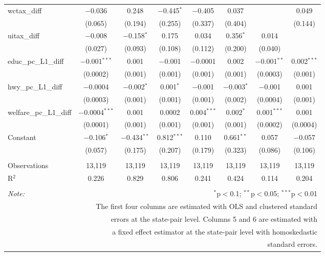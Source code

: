 \begin{table}[!htbp]
\begin{tabular}{@{\extracolsep{5pt}}lccccccc}
  wctax\_diff & $-$0.036 & 0.248 & $-$0.445$^{*}$ & $-$0.405 & 0.037 &  & 0.049 \\ 
  & (0.065) & (0.194) & (0.255) & (0.337) & (0.404) &  & (0.144) \\ 
  uitax\_diff & $-$0.008 & $-$0.158$^{*}$ & 0.175 & 0.034 & 0.356$^{*}$ & 0.014 &  \\ 
  & (0.027) & (0.093) & (0.108) & (0.112) & (0.200) & (0.040) &  \\ 
  educ\_pc\_L1\_diff & $-$0.001$^{***}$ & 0.001 & $-$0.001 & $-$0.0001 & 0.002 & $-$0.001$^{**}$ & 0.002$^{***}$ \\ 
  & (0.0002) & (0.001) & (0.001) & (0.001) & (0.001) & (0.0003) & (0.001) \\ 
  hwy\_pc\_L1\_diff & $-$0.0004 & $-$0.002$^{*}$ & 0.001$^{*}$ & $-$0.001 & $-$0.003$^{*}$ & $-$0.001 & 0.001 \\ 
  & (0.0003) & (0.001) & (0.001) & (0.001) & (0.002) & (0.0004) & (0.001) \\ 
  welfare\_pc\_L1\_diff & $-$0.0004$^{***}$ & 0.001 & 0.0002 & 0.004$^{***}$ & 0.002$^{*}$ & 0.001$^{***}$ & 0.001 \\ 
  & (0.0001) & (0.001) & (0.001) & (0.001) & (0.001) & (0.0002) & (0.0004) \\ 
  Constant & $-$0.106$^{*}$ & $-$0.434$^{**}$ & 0.812$^{***}$ & 0.110 & 0.661$^{**}$ & 0.057 & $-$0.057 \\ 
  & (0.057) & (0.175) & (0.207) & (0.179) & (0.323) & (0.086) & (0.106) \\ 
 \hline \\[-1.8ex] 
Observations & 13,119 & 13,119 & 13,119 & 13,119 & 13,119 & 13,119 & 13,119 \\ 
R$^{2}$ & 0.226 & 0.829 & 0.806 & 0.241 & 0.424 & 0.114 & 0.204 \\ 
\hline 
\hline \\[-1.8ex] 
\textit{Note:}  & \multicolumn{7}{r}{$^{*}$p$<$0.1; $^{**}$p$<$0.05; $^{***}$p$<$0.01} \\ 
 & \multicolumn{7}{r}{The first four columns are estimated with OLS and clustered standard} \\ 
 & \multicolumn{7}{r}{ errors at the state-pair level. Columns 5 and 6 are estimated with} \\ 
 & \multicolumn{7}{r}{a fixed effect estimator at the state-pair level with homoskedastic} \\ 
 & \multicolumn{7}{r}{standard errors.} \\ 
\end{tabular} 
\end{table} 
